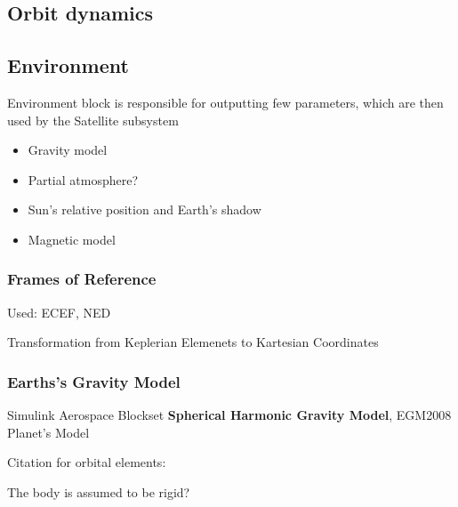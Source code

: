 \subsection{Orbit dynamics}

\subsection{Environment}
    Environment block is responsible for outputting few parameters, which are then used by the Satellite subsystem
    \begin{itemize}
        \item Gravity model
        \item Partial atmosphere?
        \item Sun's relative position and Earth's shadow
        \item Magnetic model
    \end{itemize}

    \subsubsection{Frames of Reference}
        Used: ECEF, NED

        Transformation from Keplerian Elemenets to Kartesian Coordinates

    \subsubsection{Earths's Gravity Model}
        Simulink Aerospace Blockset \textbf{Spherical Harmonic Gravity Model}, EGM2008 Planet's Model

    Citation for orbital elements: \cite{vallado2001fundamentals}

    The body is assumed to be rigid?